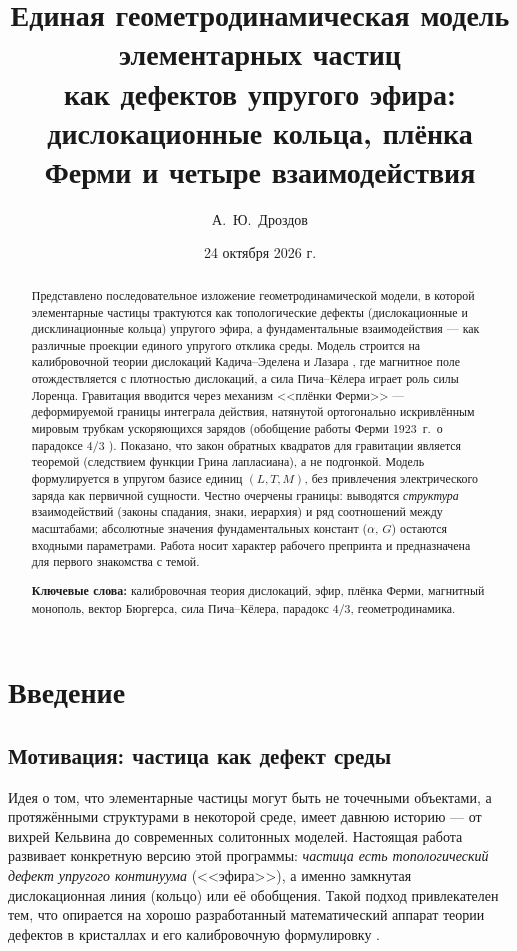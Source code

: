 \documentclass[12pt,a4paper]{article}
\title{\textbf{Единая геометродинамическая модель элементарных частиц\\
как дефектов упругого эфира:\\
дислокационные кольца, плёнка Ферми и четыре взаимодействия}}
\author{А.~Ю.~Дроздов}
\date{24 октября 2026 г.}
\begin{document}
\maketitle

\begin{abstract}
\noindent
Представлено последовательное изложение геометродинамической модели, в которой
элементарные частицы трактуются как топологические дефекты (дислокационные и
дисклинационные кольца) упругого эфира, а фундаментальные взаимодействия --- как
различные проекции единого упругого отклика среды. Модель строится на калибровочной
теории дислокаций Кадича--Эделена и Лазара \cite{lazar2010,kadic1983}, где магнитное
поле отождествляется с плотностью дислокаций, а сила Пича--Кёлера играет роль силы
Лоренца. Гравитация вводится через механизм <<плёнки Ферми>> --- деформируемой
границы интеграла действия, натянутой ортогонально искривлённым мировым трубкам
ускоряющихся зарядов (обобщение работы Ферми 1923~г.\ о парадоксе $4/3$
\cite{fermi1923}). Показано, что закон обратных квадратов для гравитации является
теоремой (следствием функции Грина лапласиана), а не подгонкой. Модель формулируется
в упругом базисе единиц $(L,T,M)$, без привлечения электрического заряда как
первичной сущности. Честно очерчены границы: выводятся \emph{структура} взаимодействий
(законы спадания, знаки, иерархия) и ряд соотношений между масштабами; абсолютные
значения фундаментальных констант ($\alpha$, $G$) остаются входными параметрами.
Работа носит характер рабочего препринта и предназначена для первого знакомства с темой.

\medskip
\noindent\textbf{Ключевые слова:} калибровочная теория дислокаций, эфир, плёнка Ферми,
магнитный монополь, вектор Бюргерса, сила Пича--Кёлера, парадокс $4/3$, геометродинамика.
\end{abstract}

\tableofcontents
\newpage

\section{Введение}

\subsection{Мотивация: частица как дефект среды}
Идея о том, что элементарные частицы могут быть не точечными объектами, а
протяжёнными структурами в некоторой среде, имеет давнюю историю --- от вихрей
Кельвина до современных солитонных моделей. Настоящая работа развивает
конкретную версию этой программы: \emph{частица есть топологический дефект
упругого континуума} (<<эфира>>), а именно замкнутая дислокационная линия
(кольцо) или её обобщения. Такой подход привлекателен тем, что опирается на
хорошо разработанный математический аппарат теории дефектов в кристаллах
\cite{hirth1982,kadic1983} и его калибровочную формулировку \cite{lazar2010}.
\end{document}
